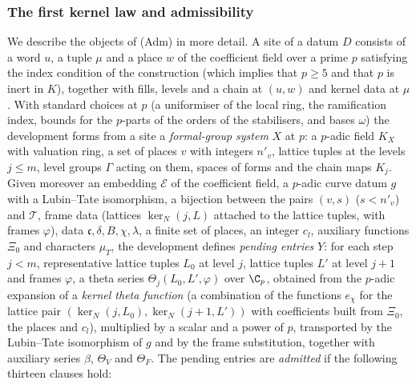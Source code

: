 \subsubsection{The first kernel law and admissibility}\label{pf:reckernel:sec-admproof}
We describe the objects of (Adm) in more detail. A site of a datum $D$ consists of a word $u$, a tuple $\mu$ and a place $w$
of the coefficient field over a prime $p$ satisfying the index condition of the construction (which implies that $p\ge5$
and that $p$ is inert in $K$), together with fills, levels and a chain at $(u,w)$ and kernel data at $\mu$. With standard
choices at $p$ (a uniformiser of the local ring, the ramification index, bounds for the $p$-parts of the orders of the
stabilisers, and bases $\omega$) the development forms from a site a \emph{formal-group system} $X$ at $p$: a $p$-adic
field $K_X$ with valuation ring, a set of places $v$ with integers $n'_v$, lattice tuples at the levels $j\le m$, level
groups $\Gamma$ acting on them, spaces of forms and the chain maps $K_j$. Given moreover an embedding $\mathcal E$ of the coefficient
field, a $p$-adic curve datum $g$ with a Lubin--Tate isomorphism, a bijection between the pairs $(v,s)$ ($s<n'_v$) and
$\mathcal T$, frame data (lattices $\ker_N(j,L)$ attached to the lattice tuples, with frames $\varphi$), data
$\mathfrak c,\delta,B,\chi,\lambda$, a finite set of places, an integer $c_l$, auxiliary functions $\Xi_0$ and characters
$\mu_T$, the development defines \emph{pending entries} $Y$: for each step $j<m$, representative lattice tuples $L_0$ at
level $j$, lattice tuples $L'$ at level $j+1$ and frames $\varphi$, a theta series $\Theta_{j}(L_0,L',\varphi)$ over $\C_p$,
obtained from the $p$-adic expansion of a \emph{kernel theta function} (a combination of the functions $e_\chi$ for the
lattice pair $(\ker_N(j,L_0),\ker_N(j+1,L'))$ with coefficients built from $\Xi_0$, the places and $c_l$), multiplied by a
scalar and a power of $p$, transported by the Lubin--Tate isomorphism of $g$ and by the frame substitution, together with
auxiliary series $\beta$, $\Theta_V$ and $\Theta_F$. The pending entries are \emph{admitted} if the following thirteen
clauses hold:
